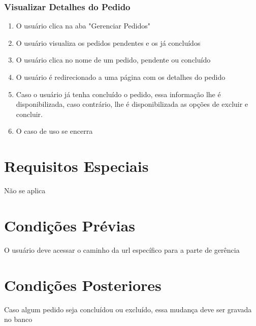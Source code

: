 \subsubsection{Visualizar Detalhes do Pedido}
\begin{enumerate}
	\item O usuário clica na aba "Gerenciar Pedidos"
	\item O usuário visualiza os pedidos pendentes e os já concluídos
	\item O usuário clica no nome de um pedido, pendente ou concluído
	\item O usuário é redirecionado a uma página com os detalhes do pedido
	\item Caso o usuário já tenha concluído o pedido, essa informação lhe é disponibilizada, caso contrário, lhe é disponibilizada as opções de excluir e concluir.
	\item O caso de uso se encerra
\end{enumerate}

\section{Requisitos Especiais}

Não se aplica

\section{Condições Prévias}

O usuário deve acessar o caminho da url específico para a parte de gerência

\section{Condições Posteriores}

Caso algum pedido seja concluídou ou excluído, essa mudança deve ser gravada no banco